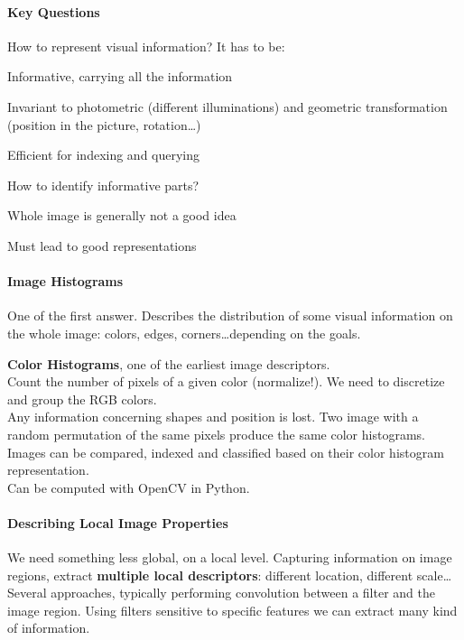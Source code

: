 \documentclass[10pt]{report}
\begin{document}
\paragraph{Key Questions}
\begin{list}{}{}
	\item How to represent visual information? It has to be:\begin{list}{}{}
		\item Informative, carrying all the information
		\item Invariant to photometric (different illuminations) and geometric transformation (position in the picture, rotation\ldots)
		\item Efficient for indexing and querying
	\end{list}
	\item How to identify informative parts?\begin{list}{}{}
		\item Whole image is generally not a good idea
		\item Must lead to good representations
	\end{list}
\end{list}
\paragraph{Image Histograms} One of the first answer. Describes the distribution of some visual information on the whole image: colors, edges, corners\ldots depending on the goals.\begin{list}{}{}
	\item \textbf{Color Histograms}, one of the earliest image descriptors.\\
	Count the number of pixels of a given color (normalize!). We need to discretize and group the RGB colors.\\
	Any information concerning shapes and position is lost. Two image with a random permutation of the same pixels produce the same color histograms.\\
	Images can be compared, indexed and classified based on their color histogram representation.\\
	Can be computed with OpenCV in Python.
\end{list}
\paragraph{Describing Local Image Properties} We need something less global, on a local level. Capturing information on image regions, extract \textbf{multiple local descriptors}: different location, different scale\ldots\\
Several approaches, typically performing convolution between a filter and the image region. Using filters sensitive to specific features we can extract many kind of information.
\end{document}
